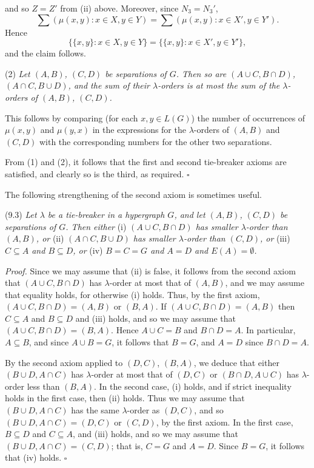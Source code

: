 \noindent and so $Z = Z'$ from (ii) above. Moreover, since $N_3 = N_3'$,
\begin{equation*}
\sum (\mu(x, y) : x \in X, y \in Y) = \sum (\mu(x, y) : x \in X', y \in Y').
\end{equation*}
Hence
\begin{equation*}
\{\{x, y\} : x \in X, y \in Y\} = \{\{x, y\} : x \in X', y \in Y'\},
\end{equation*}
and the claim follows.

\hspace*{12pt}(2) \textit{Let $(A, B)$, $(C, D)$ be separations of $G$. Then so are $(A \cup C, B \cap D)$, $(A \cap C, B \cup D)$, and the sum of their $\lambda$-orders is at most the sum of the $\lambda$-orders of $(A, B)$, $(C, D)$.}

This follows by comparing (for each $x, y \in L(G)$) the number of occurrences of $\mu(x, y)$ and $\mu(y, x)$ in the expressions for the $\lambda$-orders of $(A, B)$ and $(C, D)$ with the corresponding numbers for the other two separations.

From (1) and (2), it follows that the first and second tie-breaker axioms are satisfied, and clearly so is the third, as required. $\square$

The following strengthening of the second axiom is sometimes useful.

\stmt
(9.3) \textit{Let $\lambda$ be a tie-breaker in a hypergraph $G$, and let $(A, B)$, $(C, D)$ be separations of $G$. Then either} (i) \textit{$(A \cup C, B \cap D)$ has smaller $\lambda$-order than $(A, B)$, or} (ii) \textit{$(A \cap C, B \cup D)$ has smaller $\lambda$-order than $(C, D)$, or} (iii) \textit{$C \subseteq A$ and $B \subseteq D$, or} (iv) \textit{$B = C = G$ and $A = D$ and $E(A) = \emptyset$.}

\textit{Proof.} Since we may assume that (ii) is false, it follows from the second axiom that $(A \cup C, B \cap D)$ has $\lambda$-order at most that of $(A, B)$, and we may assume that equality holds, for otherwise (i) holds. Thus, by the first axiom, $(A \cup C, B \cap D) = (A, B)$ or $(B, A)$. If $(A \cup C, B \cap D) = (A, B)$ then $C \subseteq A$ and $B \subseteq D$ and (iii) holds, and so we may assume that $(A \cup C, B \cap D) = (B, A)$. Hence $A \cup C = B$ and $B \cap D = A$. In particular, $A \subseteq B$, and since $A \cup B = G$, it follows that $B = G$, and $A = D$ since $B \cap D = A$.

By the second axiom applied to $(D, C)$, $(B, A)$, we deduce that either $(B \cup D, A \cap C)$ has $\lambda$-order at most that of $(D, C)$ or $(B \cap D, A \cup C)$ has $\lambda$-order less than $(B, A)$. In the second case, (i) holds, and if strict inequality holds in the first case, then (ii) holds. Thus we may assume that $(B \cup D, A \cap C)$ has the same $\lambda$-order as $(D, C)$, and so $(B \cup D, A \cap C) = (D, C)$ or $(C, D)$, by the first axiom. In the first case, $B \subseteq D$ and $C \subseteq A$, and (iii) holds, and so we may assume that $(B \cup D, A \cap C) = (C, D)$; that is, $C = G$ and $A = D$. Since $B = G$, it follows that (iv) holds. $\square$
